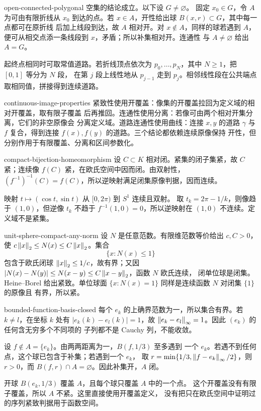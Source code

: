 \begin{solution}{open-connected-polygonal}
空集的结论成立。以下设 \(G\ne\varnothing\)。
固定 \(x_0\in G\)，令 \(A\) 为可由有限折线从 \(x_0\) 到达的点。若
\(x\in A\)，开性给出球 \(B(x,r)\subset G\)，其中每一点都可在原折线
后加上线段到达，故 \(A\) 相对开。对 \(x\notin A\)，同样的球若遇到
\(A\)，便可从相交点添一条线段到 \(x\)，矛盾；所以补集相对开。连通性
与 \(A\ne\varnothing\) 给出 \(A=G\)。

起终点相同时可取常值道路。若折线顶点依次为 \(p_0,\ldots,p_N\)，其中
\(N\ge1\)，把 \([0,1]\) 等分为 \(N\) 段，
在第 \(j\) 段上线性地从 \(p_{j-1}\) 走到 \(p_j\)。相邻线性段在公共端点
取相同值，拼接得到连续道路。
\end{solution}

\begin{solution}{continuous-image-properties}
紧致性使用开覆盖：像集的开覆盖拉回为定义域的相对开覆盖，取有限子覆盖
后再推回。连通性使用分离：若像可由两个相对开集分离，它们的非空原像会
分离定义域。道路连通性使用曲线：连接 \(x,y\) 的道路 \(\gamma\) 与
\(f\) 复合，得到连接 \(f(x),f(y)\) 的道路。三个结论都依赖连续原像保持
开性，但分别作用于有限覆盖、分离和区间参数化。
\end{solution}

\begin{solution}{compact-bijection-homeomorphism}
设 \(C\subset K\) 相对闭。紧集的闭子集紧，故 \(C\) 紧；连续像
\(f(C)\) 紧，在欧氏空间中因而闭。由双射性，
\((f^{-1})^{-1}(C)=f(C)\)，所以逆映射满足闭集原像判据，因而连续。

映射 \(t\mapsto(\cos t,\sin t)\) 从 \([0,2\pi)\) 到 \(S^1\) 连续且双射。
取 \(t_k=2\pi-1/k\)，则像趋于 \((1,0)\)，但逆像 \(t_k\) 不趋于
\(f^{-1}(1,0)=0\)，所以逆映射在 \((1,0)\) 不连续。定义域不是紧集。
\end{solution}

\begin{solution}{unit-sphere-compact-any-norm}
设 \(N\) 是任意范数。有限维范数等价给出 \(c,C>0\)，使
\(c\left\lVert x\right\rVert_2\le N(x)\le C\left\lVert x\right\rVert_2\)。集合
\[
 \{x:N(x)\le1\}
\]
包含于欧氏闭球 \(\left\lVert x\right\rVert_2\le1/c\)，故有界；又因
\(|N(x)-N(y)|\le N(x-y)\le C\left\lVert x-y\right\rVert_2\)，函数 \(N\) 欧氏连续，
闭单位球是闭集。Heine--Borel 给出紧致。单位球面
\(\{x:N(x)=1\}\) 同样是连续函数 \(N\) 对闭集 \(\{1\}\) 的原像且
有界，所以紧。
\end{solution}

\begin{solution}{bounded-function-basis-closed}
每个 \(e_k\) 的上确界范数为一，所以集合有界。若 \(k\ne l\)，在坐标
\(k\) 处有 \(|e_k(k)-e_l(k)|=1\)，故
\(\left\lVert e_k-e_l\right\rVert_\infty=1\)。因此 \((e_k)\) 的任何含无穷多个不同项的
子列都不是 Cauchy 列，不能收敛。

设 \(f\notin A=\{e_k\}\)。由两两距离为一，\(B(f,1/3)\) 至多遇到
一个 \(e_k\)。若遇不到任何点，这个球已包含于补集；若遇到一个 \(e_k\)，
取 \(r=\min\{1/3,\left\lVert f-e_k\right\rVert_\infty/2\}\)，则 \(r>0\)，而
\(B(f,r)\cap A=\varnothing\)。因此补集开，\(A\) 闭。

开球 \(B(e_k,1/3)\) 覆盖 \(A\)，且每个球只覆盖 \(A\) 中的一个点。
这个开覆盖没有有限子覆盖，所以 \(A\) 不紧。这里直接使用开覆盖定义，
没有把只在欧氏空间中证明过的序列紧致判据用于函数空间。
\end{solution}

